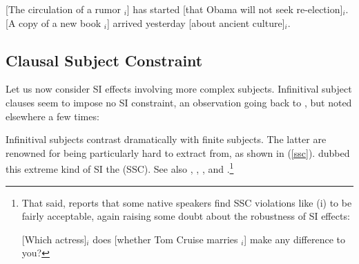 \documentclass[output=paper
 	        ,biblatex
                ,babelshorthands
                ,newtxmath
                ,draftmode
                ,colorlinks, citecolor=brown
]{langscibook}
\begin{document}
\eal \label{subxxx}
\ex {}[The circulation of a rumor \trace$_i$] has started [that Obama will not seek re-election]$_i$.
\ex {}[A  copy of a new book \trace$_i$] arrived yesterday [about ancient  culture]$_i$.

\zl


\subsection{Clausal Subject Constraint}

Let us now consider SI effects involving more complex subjects.  Infinitival subject clauses seem to
impose no SI constraint, an observation going back to \citet{kunotakamib}, but noted elsewhere a few
times:

\eal \label{vpsi}


\zl

\noindent
Infinitival subjects contrast dramatically with finite subjects. The latter are renowned for being
particularly hard to extract from, as shown in (\ref{ssc}).  \citet[]{Ross67} dubbed this extreme kind
of SI the  (SSC). See also \citet{chomsky73}, \citet{huang82},
\citet{Chomsky86b}, and \citet{freidin92}.\footnote{That said, \citet{chavessubj} reports that some
  native speakers find SSC violations like (i) to be fairly acceptable, again raising some doubt
  about the robustness of  SI effects:

\ea
{}[Which actress]$_i$ does [whether Tom Cruise marries \trace$_i$] make any difference to you?
\zlast
}
\end{document}
